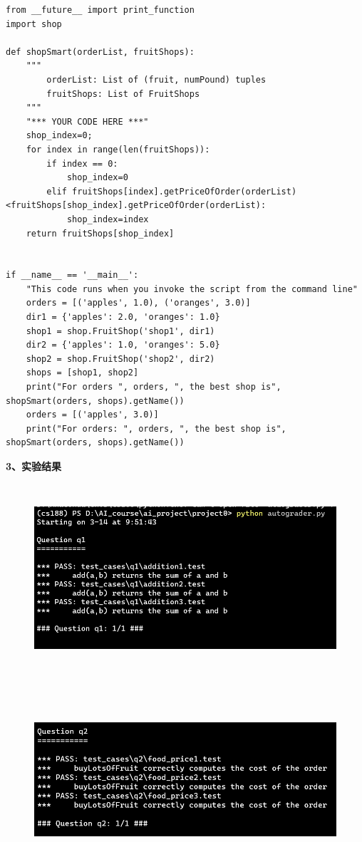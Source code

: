 \documentclass[a4paper,12pt,UTF8]{article}
\begin{document}
\begin{flushleft}
{{       }
       \scriptsize{
        \begin{lstlisting}
from __future__ import print_function
import shop

def shopSmart(orderList, fruitShops):
    """
        orderList: List of (fruit, numPound) tuples
        fruitShops: List of FruitShops
    """
    "*** YOUR CODE HERE ***"
    shop_index=0;
    for index in range(len(fruitShops)):
        if index == 0:
            shop_index=0
        elif fruitShops[index].getPriceOfOrder(orderList)<fruitShops[shop_index].getPriceOfOrder(orderList):
            shop_index=index
    return fruitShops[shop_index]


if __name__ == '__main__':
    "This code runs when you invoke the script from the command line"
    orders = [('apples', 1.0), ('oranges', 3.0)]
    dir1 = {'apples': 2.0, 'oranges': 1.0}
    shop1 = shop.FruitShop('shop1', dir1)
    dir2 = {'apples': 1.0, 'oranges': 5.0}
    shop2 = shop.FruitShop('shop2', dir2)
    shops = [shop1, shop2]
    print("For orders ", orders, ", the best shop is", shopSmart(orders, shops).getName())
    orders = [('apples', 3.0)]
    print("For orders: ", orders, ", the best shop is", shopSmart(orders, shops).getName())
        \end{lstlisting}
       }
       \large{
        \textbf{3、实验结果\\}
        \begin{figure}[h]
            \centering
        \includegraphics[width=12cm,height=7cm]{1}
        \end{figure}
        \begin{figure}[h]
            \centering
        \includegraphics[width=12cm,height=7cm]{2}

\end{figure}}}
\end{flushleft}
\end{document}
